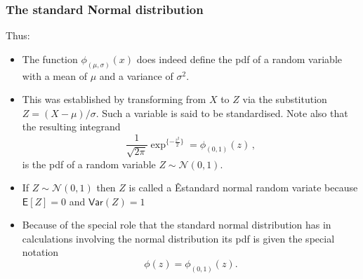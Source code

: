 \documentclass[notes=show,smaller,handout]{beamer}\usepackage[]{graphicx}\usepackage[]{color}
\newcommand{\N}{\mathcal{N}}
\begin{document}
\begin{frame}%

\frametitle{The standard Normal distribution}

Thus:
\begin{itemize}
  \item The function $\phi_{(\mu,\sigma)}(x)$ does indeed define the pdf of a random variable with a mean of $\mu$ and a variance of $\sigma^2$.
\item This was established by transforming from $X$ to $Z$ via the substitution $Z=(X-\mu)/\sigma$. Such a variable
is said to be standardised. Note also that the resulting integrand
$$
\frac{1}{\sqrt{2\pi}}\exp^{\{-\frac{z^2}{2}\}}=\phi_{(0,1)}(z)\,,
$$
is the pdf of a random variable $Z\sim \N(0,1)$.
\item If $Z\sim \N(0,1)$ then $Z$ is called a \color{blue}Êstandard normal random variate \color{black} because
$
\textsf{E}[Z]=0$ and $\textsf{Var}(Z)=1$

\item Because of the special role that the standard normal distribution has in
calculations involving the normal distribution its pdf is given the special notation
$$\phi(z)=\phi_{(0,1)}(z).$$
\end{itemize}

\end{frame}%
\end{document}
